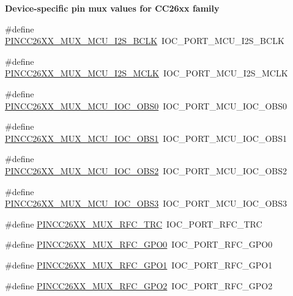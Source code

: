 \begin{Indent}{\bf Device-\/specific pin mux values for C\+C26xx family}
\begin{DoxyCompactItemize}
\item 
\#define \hyperlink{_p_i_n_c_c26_x_x_8h_a1ca04c323c59730e77a057e750844564}{P\+I\+N\+C\+C26\+X\+X\+\_\+\+M\+U\+X\+\_\+\+M\+C\+U\+\_\+\+I2\+S\+\_\+\+B\+C\+L\+K}~I\+O\+C\+\_\+\+P\+O\+R\+T\+\_\+\+M\+C\+U\+\_\+\+I2\+S\+\_\+\+B\+C\+L\+K
\item 
\#define \hyperlink{_p_i_n_c_c26_x_x_8h_ae41e6f48afb4b7b06fac72ef98dd1866}{P\+I\+N\+C\+C26\+X\+X\+\_\+\+M\+U\+X\+\_\+\+M\+C\+U\+\_\+\+I2\+S\+\_\+\+M\+C\+L\+K}~I\+O\+C\+\_\+\+P\+O\+R\+T\+\_\+\+M\+C\+U\+\_\+\+I2\+S\+\_\+\+M\+C\+L\+K
\item 
\#define \hyperlink{_p_i_n_c_c26_x_x_8h_addccd8c5026c8495a80976147d4bc5a7}{P\+I\+N\+C\+C26\+X\+X\+\_\+\+M\+U\+X\+\_\+\+M\+C\+U\+\_\+\+I\+O\+C\+\_\+\+O\+B\+S0}~I\+O\+C\+\_\+\+P\+O\+R\+T\+\_\+\+M\+C\+U\+\_\+\+I\+O\+C\+\_\+\+O\+B\+S0
\item 
\#define \hyperlink{_p_i_n_c_c26_x_x_8h_a57f8194fc7a00cd647911430143188b4}{P\+I\+N\+C\+C26\+X\+X\+\_\+\+M\+U\+X\+\_\+\+M\+C\+U\+\_\+\+I\+O\+C\+\_\+\+O\+B\+S1}~I\+O\+C\+\_\+\+P\+O\+R\+T\+\_\+\+M\+C\+U\+\_\+\+I\+O\+C\+\_\+\+O\+B\+S1
\item 
\#define \hyperlink{_p_i_n_c_c26_x_x_8h_a24858e6ec06e34d6528950cb93fbf9d9}{P\+I\+N\+C\+C26\+X\+X\+\_\+\+M\+U\+X\+\_\+\+M\+C\+U\+\_\+\+I\+O\+C\+\_\+\+O\+B\+S2}~I\+O\+C\+\_\+\+P\+O\+R\+T\+\_\+\+M\+C\+U\+\_\+\+I\+O\+C\+\_\+\+O\+B\+S2
\item 
\#define \hyperlink{_p_i_n_c_c26_x_x_8h_a8e5035975aa783c89f1f1dca963300b8}{P\+I\+N\+C\+C26\+X\+X\+\_\+\+M\+U\+X\+\_\+\+M\+C\+U\+\_\+\+I\+O\+C\+\_\+\+O\+B\+S3}~I\+O\+C\+\_\+\+P\+O\+R\+T\+\_\+\+M\+C\+U\+\_\+\+I\+O\+C\+\_\+\+O\+B\+S3
\item 
\#define \hyperlink{_p_i_n_c_c26_x_x_8h_a4b9269f9eac469a814f20ac6f96196a9}{P\+I\+N\+C\+C26\+X\+X\+\_\+\+M\+U\+X\+\_\+\+R\+F\+C\+\_\+\+T\+R\+C}~I\+O\+C\+\_\+\+P\+O\+R\+T\+\_\+\+R\+F\+C\+\_\+\+T\+R\+C
\item 
\#define \hyperlink{_p_i_n_c_c26_x_x_8h_a89e0489423caa21a1e6339e018d925f2}{P\+I\+N\+C\+C26\+X\+X\+\_\+\+M\+U\+X\+\_\+\+R\+F\+C\+\_\+\+G\+P\+O0}~I\+O\+C\+\_\+\+P\+O\+R\+T\+\_\+\+R\+F\+C\+\_\+\+G\+P\+O0
\item 
\#define \hyperlink{_p_i_n_c_c26_x_x_8h_aab76af2130f96f3da07131cfd232ce71}{P\+I\+N\+C\+C26\+X\+X\+\_\+\+M\+U\+X\+\_\+\+R\+F\+C\+\_\+\+G\+P\+O1}~I\+O\+C\+\_\+\+P\+O\+R\+T\+\_\+\+R\+F\+C\+\_\+\+G\+P\+O1
\item 
\#define \hyperlink{_p_i_n_c_c26_x_x_8h_a144116dadf2ba363c54c7d2507abe54e}{P\+I\+N\+C\+C26\+X\+X\+\_\+\+M\+U\+X\+\_\+\+R\+F\+C\+\_\+\+G\+P\+O2}~I\+O\+C\+\_\+\+P\+O\+R\+T\+\_\+\+R\+F\+C\+\_\+\+G\+P\+O2

\end{DoxyCompactItemize}
\end{Indent}
